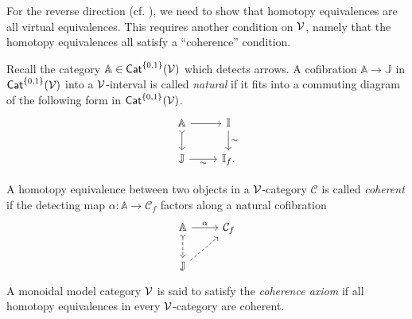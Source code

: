 \documentclass[a4paper,10pt
,draft
]{article}%
\newcommand{\I}{\mathbb I}
\newcommand{\J}{\mathbb J}
\renewcommand{\1}{\eta}%
\begin{document}



For the reverse direction (cf. \cite[\S 2]{BM13}), we need to show that
homotopy equivalences are all virtual equivalences.
This requires another condition on $\mathcal V$, namely that the homotopy equivalences all satisfy a ``coherence'' condition.

\begin{definition}
      Recall the category $\mathbb A \in \mathsf{Cat}^{\left\{0,1\right\}}(\mathcal V)$ which detects arrows.
      A cofibration $\mathbb A \to \J$ in $\mathsf{Cat}^{\left\{0,1\right\}}(\mathcal V)$ into a $\mathcal V$-interval is called \textit{natural} if
      it fits into a commuting diagram of the following form in $\mathsf{Cat}^{\left\{0,1\right\}}(\mathcal V)$.
      \begin{equation}
            \begin{tikzcd}
                  \mathbb A \arrow[d, tail] \arrow[r]
                  &
                  \I \arrow[d, "\sim"]
                  \\
                  \J \arrow[r, "\sim"']
                  &
                  \I_f.
            \end{tikzcd}
      \end{equation}

      A homotopy equivalence between two objects in a $\mathcal V$-category $\mathcal C$ is called \textit{coherent} if
      the detecting map $\alpha: \mathbb A \to \mathcal C_f$ factors along a natural cofibration
      \begin{equation}
            \begin{tikzcd}
                  \mathbb A \arrow[r, "\alpha"] \arrow[d, tail, dashed]
                  &
                  \mathcal C_f
                  \\
                  \J \arrow[ur, dashed]
            \end{tikzcd}
      \end{equation}
      A monoidal model category $\mathcal V$ is said to satisfy the \textit{coherence axiom} if
      all homotopy equivalences in every $\mathcal V$-category are coherent.
\end{definition}
\end{document}
